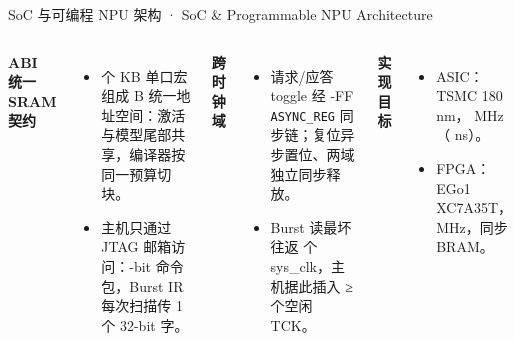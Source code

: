 \documentclass[10pt,aspectratio=169,hyperref={colorlinks,urlcolor=steel,linkcolor=}]{beamer}
\newcommand{\tsub}[1]{\texttt{#1}}
\begin{document}
\begin{frame}{SoC 与可编程 NPU 架构 · SoC \& Programmable NPU Architecture}
\begin{columns}[T,onlytextwidth]
\begin{tikzpicture}[node distance=0.42cm and 0.42cm, font=\scriptsize]
    \end{tikzpicture}
    {\small\textbf{ABI \NAbi{} 统一 SRAM 契约}}
    \begin{itemize}\setlength{\itemsep}{1pt}
      \item \NMacroCount{} 个 \NSramMacroKB{} KB 单口宏组成 \NSramBytes{} B 统一地址空间：激活与模型尾部共享，编译器按同一预算切块。
      \item 主机只通过 JTAG 邮箱访问：\NJtagPacketBits-bit 命令包，Burst IR 每次扫描传 1 个 32-bit 字。
    \end{itemize}\par\vspace{3pt}
    {\small\textbf{跨时钟域}}
    \begin{itemize}\setlength{\itemsep}{1pt}
      \item 请求/应答 toggle 经 \NSyncStages-FF \tsub{ASYNC\_REG} 同步链；复位异步置位、两域独立同步释放。
      \item Burst 读最坏往返 \NBurstSysCycles{} 个 sys\_clk，主机据此插入 ≥\NIdleTckMin{} 个空闲 TCK。
    \end{itemize}\par\vspace{3pt}
    {\small\textbf{实现目标}}
    \begin{itemize}\setlength{\itemsep}{1pt}
      \item ASIC：TSMC 180 nm，\NAsicClk{} MHz（\NAsicPeriod{} ns）。
      \item FPGA：EGo1 XC7A35T，\NSysClk{} MHz，同步 BRAM。
    \end{itemize}
  \end{columns}
\end{frame}
\end{document}
